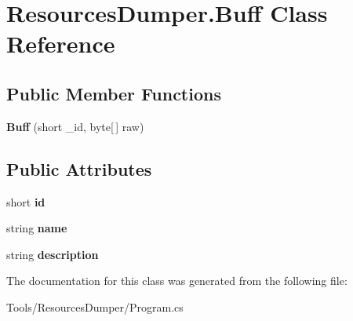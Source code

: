 \hypertarget{class_resources_dumper_1_1_buff}{\section{Resources\-Dumper.\-Buff Class Reference}
\label{class_resources_dumper_1_1_buff}
}
\subsection*{Public Member Functions}
\begin{DoxyCompactItemize}
\item 
\hypertarget{class_resources_dumper_1_1_buff_ae5be09dcfcc80ccef1bf0f00211e2316}{{\bfseries Buff} (short \-\_\-id, byte\mbox{[}$\,$\mbox{]} raw)}\label{class_resources_dumper_1_1_buff_ae5be09dcfcc80ccef1bf0f00211e2316}

\end{DoxyCompactItemize}
\subsection*{Public Attributes}
\begin{DoxyCompactItemize}
\item 
\hypertarget{class_resources_dumper_1_1_buff_a0f18d6c9e5315fb292ecd9b30b8f3347}{short {\bfseries id}}\label{class_resources_dumper_1_1_buff_a0f18d6c9e5315fb292ecd9b30b8f3347}

\item 
\hypertarget{class_resources_dumper_1_1_buff_aada19799ab6b54fd47252d7a710768e5}{string {\bfseries name}}\label{class_resources_dumper_1_1_buff_aada19799ab6b54fd47252d7a710768e5}

\item 
\hypertarget{class_resources_dumper_1_1_buff_adcab19fa2d75901d90a8a54b63309a0e}{string {\bfseries description}}\label{class_resources_dumper_1_1_buff_adcab19fa2d75901d90a8a54b63309a0e}

\end{DoxyCompactItemize}


The documentation for this class was generated from the following file\-:\begin{DoxyCompactItemize}
\item 
Tools/\-Resources\-Dumper/Program.\-cs\end{DoxyCompactItemize}
